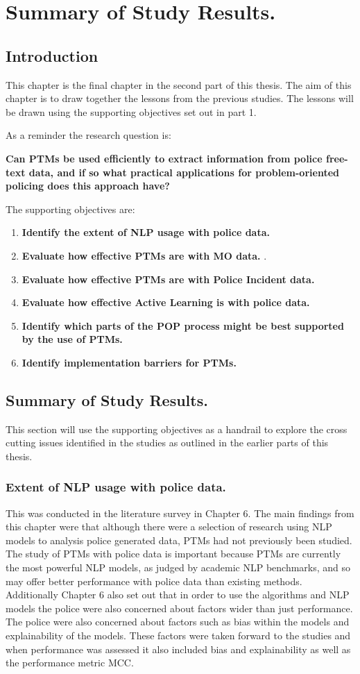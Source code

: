 \chapter{Summary of Study Results.}


\section{Introduction} This chapter is the final chapter in the second part of this thesis. The aim of this chapter is to draw together the lessons from the previous studies. The lessons will be drawn using the supporting objectives set out in part 1.

As a reminder the research question is:

\textbf{Can PTMs be used efficiently to extract information from police free-text data, and if so what practical applications for problem-oriented policing does this approach have?}

The supporting objectives are:
\begin{enumerate}
\item {\bf Identify the extent of NLP usage with police data.} 
\item {\bf Evaluate how effective PTMs are with MO data.} .
\item {\bf Evaluate how effective PTMs are with Police Incident data.} 
\item {\bf Evaluate how effective Active Learning is with police data.}  
\item {\bf Identify which parts of the POP process might be best supported by the use of PTMs.} 
\item {\bf Identify implementation barriers for PTMs.} 
\end{enumerate}

\section{Summary of Study Results.} This section will use the supporting objectives as a handrail to explore the cross cutting issues identified in the studies as outlined in the earlier parts of this thesis.

\subsection{Extent of NLP usage with police data.} This was conducted in the literature survey in Chapter 6. The main findings from this chapter were that although there were a selection of research using NLP models to analysis police generated data, PTMs had not previously been studied. The study of PTMs with police data is important because PTMs are currently the most powerful NLP models, as judged by academic NLP benchmarks, and so may offer better performance with police data than existing methods. Additionally Chapter 6 also set out that in order to use the algorithms and NLP models the police were also concerned about factors wider than just performance. The police were also concerned about factors such as bias within the models and explainability of the models. These  factors were taken forward to the studies and when performance was assessed it also included bias and explainability as well as the performance metric MCC.

